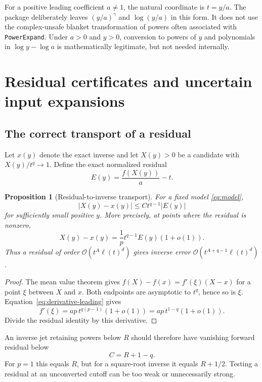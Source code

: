 \documentclass[11pt,a4paper]{article}
\numberwithin{equation}{section}
\newtheorem{proposition}[theorem]{Proposition}
\theoremstyle{definition}
\newcommand{\OO}{\mathcal O}
\newcommand{\code}[1]{\texttt{#1}}
\begin{document}
For a positive leading coefficient $a\ne1$, the natural coordinate is
$t=y/a$. The package deliberately leaves $(y/a)^\gamma$ and
$\log(y/a)$ in this form. It does not use the complex-unsafe blanket
transformation of powers often associated with \code{PowerExpand}.
Under $a>0$ and $y>0$, conversion to powers of $y$ and polynomials in
$\log y-\log a$ is mathematically legitimate, but not needed internally.

\section{Residual certificates and uncertain input expansions}\label{sec:residual}

\subsection{The correct transport of a residual}
Let $x(y)$ denote the exact inverse and let $X(y)>0$ be a candidate with
$X(y)/t^q\to1$. Define the exact normalized residual
\begin{equation}\label{eq:residual-definition}
 E(y)=\frac{f(X(y))}{a}-t.
\end{equation}

\begin{proposition}[Residual-to-inverse transport]\label{prop:transport}
For a fixed model \eqref{eq:model},
\begin{equation}\label{eq:transport}
 |X(y)-x(y)|\le C t^{q-1}|E(y)|
\end{equation}
for sufficiently small positive $y$. More precisely, at points where the
residual is nonzero,
\begin{equation}\label{eq:transport-first}
 X(y)-x(y)=\frac1p t^{q-1}E(y)(1+o(1)).
\end{equation}
Thus a residual of order $\OO(t^A\ell(t)^d)$ gives inverse error
$\OO(t^{A+q-1}\ell(t)^d)$.
\end{proposition}
\begin{proof}
The mean value theorem gives
$f(X)-f(x)=f'(\xi)(X-x)$ for a point $\xi$ between $X$ and $x$.
Both endpoints are asymptotic to $t^q$, hence so is $\xi$.
Equation~\eqref{eq:derivative-leading} gives
\[
 f'(\xi)=ap\,t^{q(p-1)}(1+o(1))
        =ap\,t^{1-q}(1+o(1)).
\]
Divide the residual identity by this derivative.
\end{proof}

An inverse jet retaining powers below $R$ should therefore have vanishing
forward residual below
\begin{equation}\label{eq:residual-cutoff}
 C=R+1-q.
\end{equation}
For $p=1$ this equals $R$, but for a square-root inverse it equals
$R+1/2$. Testing a residual at an unconverted cutoff can be too weak or
unnecessarily strong.
\end{document}
